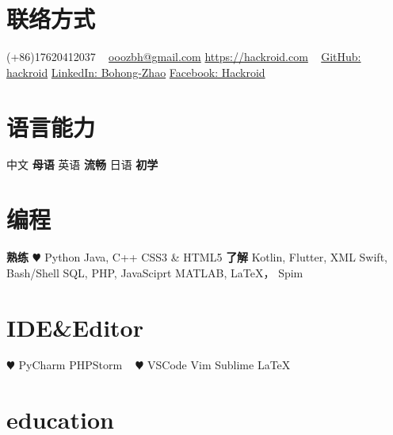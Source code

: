\documentclass[hidelinks__VERSION__]{adamyi-cv}
\begin{document}



\begin{aside} %
\section{联络方式}
(+86)17620412037
~
\href{mailto:ooozbh@gmail.com}{ooozbh@gmail.com}
\href{https://hackroid.com}{https://hackroid.com}
~
\href{https://github.com/hackroid}{GitHub: hackroid}
\href{https://www.linkedin.com/in/%E5%8D%9A%E5%BC%98-%E8%B5%B5-b7ab09136/}{LinkedIn: Bohong-Zhao}
\href{https://www.facebook.com/Hackro1d}{Facebook: Hackroid}
\section{语言能力}
中文 \textbf{母语}
英语 \textbf{流畅}
日语 \textbf{初学}
\section{编程}
\textbf{熟练}
{\color{red} $\varheart$} Python
Java, C++
CSS3 \& HTML5
\textbf{了解}
Kotlin, Flutter, XML
Swift, Bash/Shell
SQL, PHP, JavaSciprt
MATLAB, \LaTeX， Spim
\section{IDE\&Editor}
{\color{red} $\varheart$} PyCharm
PHPStorm
~
{\color{red} $\varheart$} VSCode
Vim
Sublime
\LaTeX
\versionsection
\end{aside}


\section{education}
\end{document}
